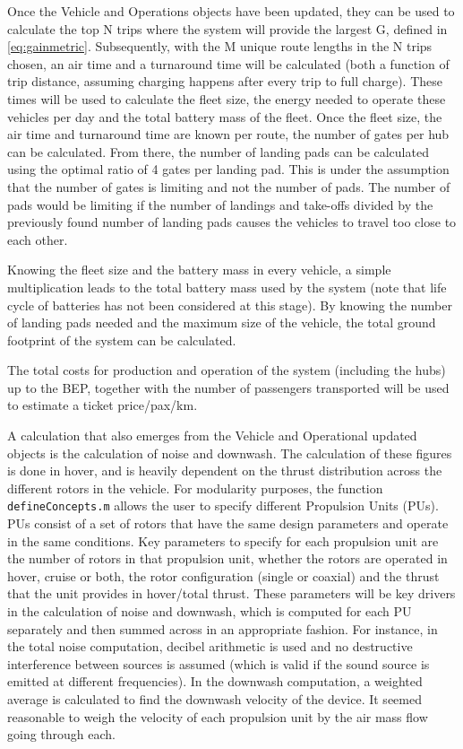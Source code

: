Once the Vehicle and Operations objects have been updated, they can be used to calculate the top N trips where the  system will provide the largest G, defined in \autoref{eq:gainmetric}. Subsequently, with the M unique route lengths in the N trips chosen, an air time and a turnaround time will be calculated (both a function of trip distance, assuming charging happens after every trip to full charge). These times will be used to calculate the fleet size, the energy needed to operate these vehicles per day and the total battery mass of the fleet. Once the fleet size, the air time and turnaround time are known per route, the number of gates per hub can be calculated. From there, the number of landing pads can be calculated using the optimal ratio of 4 gates per landing pad. This is under the assumption that the number of gates is limiting and not the number of pads. The number of pads would be limiting if the number of landings and take-offs divided by the previously found number of landing pads causes the vehicles to travel too close to each other.

Knowing the fleet size and the battery mass in every vehicle, a simple multiplication leads to the total battery mass used by the system (note that life cycle of batteries has not been considered at this stage). By knowing the number of landing pads needed and the maximum size of the vehicle, the total ground footprint of the system can be calculated. 

The total costs for production and operation of the system (including the hubs) up to the BEP, together with the number of passengers transported will be used to estimate a ticket price/pax/km.

A calculation that also emerges from the Vehicle and Operational updated objects is the calculation of noise and downwash. The calculation of these figures is done in hover, and is heavily dependent on the thrust distribution across the different rotors in the vehicle. For modularity purposes, the function \texttt{defineConcepts.m} allows the user to specify different Propulsion Units (PUs). PUs consist of a set of rotors that have the same design parameters and operate in the same conditions. Key parameters to specify for each propulsion unit are the number of rotors in that propulsion unit, whether the rotors are operated in hover, cruise or both, the rotor configuration (single or coaxial) and the thrust that the unit provides in hover/total thrust. These parameters will be key drivers in the calculation of noise and downwash, which is computed for each PU separately and then summed across in an appropriate fashion. For instance, in the total noise computation, decibel arithmetic is used and no destructive interference between sources is assumed (which is valid if the sound source is emitted at different frequencies). In the downwash computation, a weighted average is calculated to find the downwash velocity of the device. It seemed reasonable to weigh the velocity of each propulsion unit by the air mass flow going through each.


